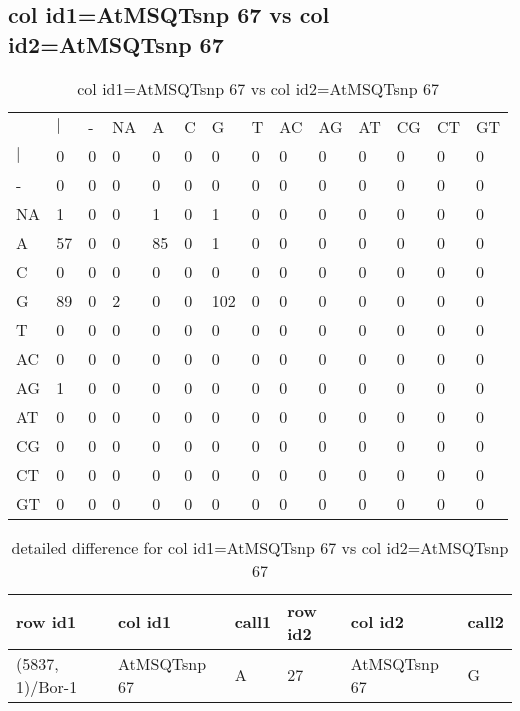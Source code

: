 \subsection{col id1=AtMSQTsnp 67 vs col id2=AtMSQTsnp 67}
\begin{center}
\begin{longtable}{|l|l|l|l|l|l|l|l|l|l|l|l|l|l|}
\caption{col id1=AtMSQTsnp 67 vs col id2=AtMSQTsnp 67} \label{table_dm954}\\
\hline
\\
\hline
&$|$&-&NA&A&C&G&T&AC&AG&AT&CG&CT&GT\\
$|$&0&0&0&0&0&0&0&0&0&0&0&0&0\\
-&0&0&0&0&0&0&0&0&0&0&0&0&0\\
NA&1&0&0&1&0&1&0&0&0&0&0&0&0\\
A&57&0&0&85&0&1&0&0&0&0&0&0&0\\
C&0&0&0&0&0&0&0&0&0&0&0&0&0\\
G&89&0&2&0&0&102&0&0&0&0&0&0&0\\
T&0&0&0&0&0&0&0&0&0&0&0&0&0\\
AC&0&0&0&0&0&0&0&0&0&0&0&0&0\\
AG&1&0&0&0&0&0&0&0&0&0&0&0&0\\
AT&0&0&0&0&0&0&0&0&0&0&0&0&0\\
CG&0&0&0&0&0&0&0&0&0&0&0&0&0\\
CT&0&0&0&0&0&0&0&0&0&0&0&0&0\\
GT&0&0&0&0&0&0&0&0&0&0&0&0&0\\
\hline
\end{longtable}
\end{center}

\begin{center}
\begin{longtable}{|l|l|l|l|l|l|}
\caption{detailed difference for col id1=AtMSQTsnp 67 vs col id2=AtMSQTsnp 67} \label{table_dm955}\\
\hline
row id1&col id1&call1&row id2&col id2&call2\\
\hline
(5837, 1)/Bor-1&AtMSQTsnp 67&A&27&AtMSQTsnp 67&G\\
\hline
\end{longtable}
\end{center}

